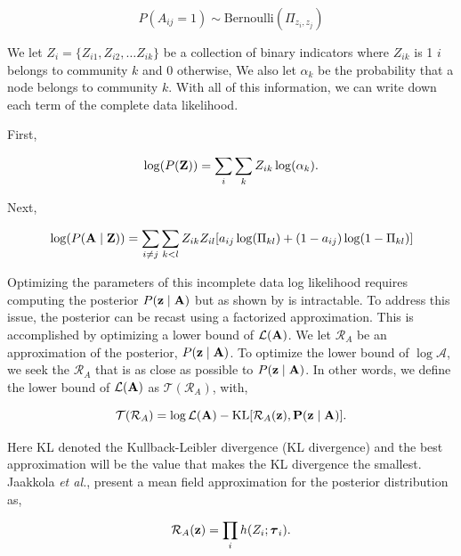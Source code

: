 \begin{equation}
P(A_{ij}=1)\sim \text{Bernoulli}(\Pi_{z_{i},z_{j}})
\end{equation}

We let $Z_{i}=\{Z_{i1},Z_{i2}, \dots Z_{ik}\}$ be a collection of binary indicators where $Z_{ik}$ is 1 $i$ belongs to community $k$ and 0 otherwise, We also let $\alpha_{k}$ be the probability that a node belongs to community $k$. With all of this information, we can write down each term of the complete data likelihood.

First,

\begin{equation}
\log(P({\bf Z}))=\sum_{i}\sum_{k}Z_{ik}\log(\alpha_{k}).
\end{equation}

Next,

\begin{equation}
\log(P({\bf A} \mid {\bf Z}))=\sum_{i\ne j}\sum_{k< l}Z_{ik}Z_{il}[a_{ij}\log (\Pi_{kl})+(1-a_{ij})\log(1-\Pi_{kl})]
\end{equation}

Optimizing the parameters of this incomplete data log likelihood requires computing the posterior $P({\bf z} \mid {\bf A})$ but as shown by \cite{dudin} is intractable. To address this issue, the posterior can be recast using a factorized approximation. This is accomplished by optimizing a lower bound of $\mathcal{L}({\bf A})$. We let $\mathcal{R}_{A}$ be an approximation of the posterior, $P({\bf z} \mid {\bf A})$. To optimize the lower bound of $\log \mathcal{A}$, we seek the $\mathcal{R}_{A}$ that is as close as possible to $P({\bf z} \mid {\bf A})$. In other words, we define the lower bound of $\mathcal{L}({\bf A})$ as $\mathcal{T}(\mathcal{R}_{A})$, with,

\begin{equation}
\mathcal{T}(\mathcal{R}_{A})=\log \mathcal{L}({\bf A})-\text{KL}[\mathcal{R}_{A}(\bf z), P({\bf z} \mid {\bf A})].
\end{equation}

Here KL denoted the Kullback-Leibler divergence (KL divergence) and the best approximation will be the value that makes the KL divergence the smallest. Jaakkola \emph{et al.}, present a mean field approximation for the posterior distribution \cite{jakk} as,

\begin{equation}
\mathcal{R}_{A}({\bf z})=\prod_{i}h(Z_{i};{\boldsymbol \tau}_{i}).
\end{equation}

